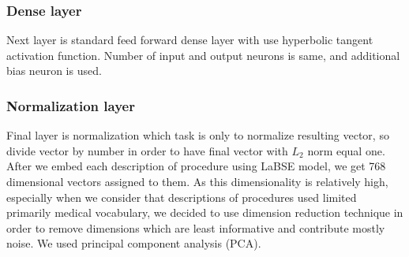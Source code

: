 \subsubsection{Dense layer}

Next layer is standard feed forward dense layer with use hyperbolic tangent activation function. Number of input and output neurons is same, and additional bias neuron is used.

\subsubsection{Normalization layer}

Final layer is normalization which task is only to normalize resulting vector, so divide vector by number in order to have final vector with $L_2$ norm equal one.
\\

After we embed each description of procedure using LaBSE model, we get 768 dimensional vectors assigned to them. As this dimensionality is relatively high, especially when we consider that descriptions of procedures used limited primarily medical vocabulary, we decided to use dimension reduction technique in order to remove dimensions which are least informative and contribute mostly noise. We used principal component analysis (PCA).

